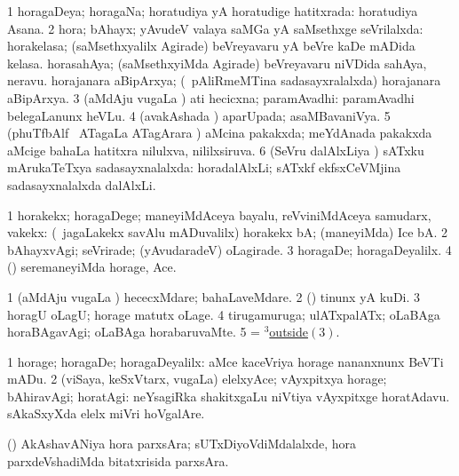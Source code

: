 \bentry
{}
\gl{\gu}
\bmng
\bnum
\num{1} horagaDeya; horagaNa; horatudiya yA horatudige hatitxrada:  horatudiya Asana. 
\num{2} hora; bAhayx; yAvudeV valaya saMGa yA saMsethxge seVrilalxda:  horakelasa; (saMsethxyalilx Agirade) beVreyavaru yA beVre kaDe mADida kelasa.  horasahAya; (saMsethxyiMda Agirade) beVreyavaru niVDida sahAya, neravu.  horajanara aBipArxya; (\kanmu\ pAliRmeMTina sadasayxralalxda) horajanara aBipArxya. 
\num{3} (aMdAju \mo vugaLa \vi) ati hecicxna; paramAvadhi:  paramAvadhi belegaLanunx heVLu. 
\num{4} (avakAshada \vi) aparUpada; asaMBavaniVya. 
\num{5} (phuTfbAlf \mo\ ATagaLa ATagArara \vi) aMcina pakakxda; meYdAnada pakakxda aMcige bahaLa hatitxra nilulxva, nililxsiruva. 
\num{6} (SeVru dalAlxLiya \vi) sATxku mArukaTeTxya sadasayxnalalxda:  horadalAlxLi; sATxkf ekfsxCeVMjina sadasayxnalalxda dalAlxLi. 
\enum
\emng
\eentry

\bentry
{}
\gl{\kirxvi}
\bmng
\bnum
\num{1} horakekx; horagaDege; maneyiMdAceya bayalu, reVviniMdAceya samudarx, \mo vakekx:  (\kanmu\ jagaLakekx savAlu mADuvalilx) horakekx bA; (maneyiMda) Ice bA. 
\num{2} bAhayxvAgi; seVrirade; (yAvudaradeV) oLagirade. 
\hypertarget{outside(3)3}{} 
\num{3} horagaDe; horagaDeyalilx. 
\num{4} (\ashi) seremaneyiMda horage, Ace. 
\enum
\emng

\noindent
\gl{\pagu}
\bmng
\bnum
\num{1}  (aMdAju \mo vugaLa \vi) hececxMdare; bahaLaveMdare. 
\num{2}  (\ashi) tinunx yA kuDi. 
\num{3}  horagU oLagU; horage matutx oLage. 
\num{4}  tirugamuruga; ulATxpalATx; oLaBAga horaBAgavAgi; oLaBAga horabaruvaMte. 
\num{5}  = \hyperlink{outside(3)3}{$^3$outside\((3)\)}. 
\enum
\emng
\eentry

\bentry
{}
\gl{\uparx}
\bmng
\bnum
\num{1} horage; horagaDe; horagaDeyalilx:  aMce kaceVriya horage nananxnunx BeVTi mADu. 
\num{2} (viSaya, keSxVtarx, \mo vugaLa) elelxyAce; vAyxpitxya horage; bAhiravAgi; horatAgi:  neYsagiRka shakitxgaLu niVtiya vAyxpitxge horatAdavu.  sAkaSxyXda elelx miVri hoVgalAre. 
\enum
\emng
\eentry

\bentry
{}
\gl{\nA}
\bmng
(\birx) AkAshavANiya hora parxsAra; sUTxDiyoVdiMdalalxde, hora parxdeVshadiMda bitatxrisida parxsAra. 
\emng
\eentry

